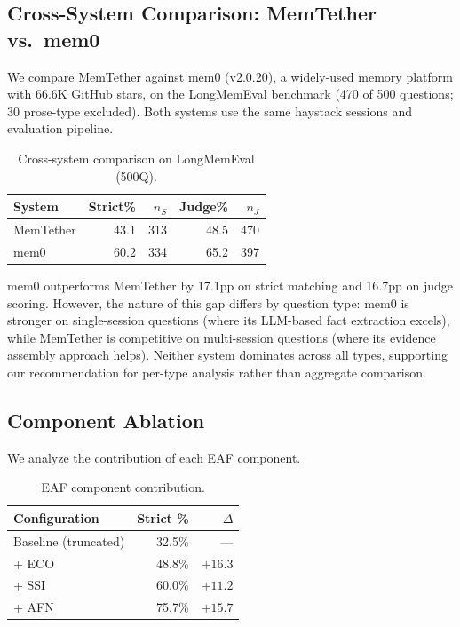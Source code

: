 \documentclass{article}
\begin{document}
\subsection{Cross-System Comparison: MemTether vs.\ mem0}

We compare MemTether against mem0 (v2.0.20), a widely-used memory platform with 66.6K GitHub stars, on the LongMemEval benchmark (470 of 500 questions; 30 prose-type excluded). Both systems use the same haystack sessions and evaluation pipeline.

\begin{table}[h]
\centering
\caption{Cross-system comparison on LongMemEval (500Q).}
\label{tab:mem0}
\begin{tabular}{lrrrr}
\toprule
System & Strict\% & $n_S$ & Judge\% & $n_J$ \\
\midrule
MemTether & 43.1 & 313 & 48.5 & 470 \\
mem0 & 60.2 & 334 & 65.2 & 397 \\
\bottomrule
\end{tabular}
\end{table}

mem0 outperforms MemTether by 17.1pp on strict matching and 16.7pp on judge scoring. However, the nature of this gap differs by question type: mem0 is stronger on single-session questions (where its LLM-based fact extraction excels), while MemTether is competitive on multi-session questions (where its evidence assembly approach helps). Neither system dominates across all types, supporting our recommendation for per-type analysis rather than aggregate comparison.



\subsection{Component Ablation}
We analyze the contribution of each EAF component.

\begin{table}[t]
\centering
\caption{EAF component contribution.}
\label{tab:eaf-ablation}
\begin{tabular}{lrr}
\toprule
Configuration & Strict \% & $\Delta$ \\
\midrule
Baseline (truncated) & 32.5\% & --- \\
+ ECO & 48.8\% & $+16.3$ \\
+ SSI & 60.0\% & $+11.2$ \\
+ AFN & 75.7\% & $+15.7$ \\
\bottomrule
\end{tabular}
\end{table}
\end{document}
